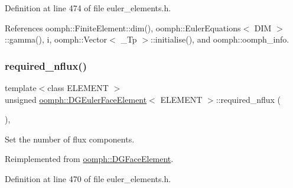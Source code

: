 Definition at line 474 of file euler\+\_\+elements.\+h.



References oomph\+::\+Finite\+Element\+::dim(), oomph\+::\+Euler\+Equations$<$ D\+I\+M $>$\+::gamma(), i, oomph\+::\+Vector$<$ \+\_\+\+Tp $>$\+::initialise(), and oomph\+::oomph\+\_\+info.

\mbox{\label{classoomph_1_1DGEulerFaceElement_aa20647527c6e5dc1febb13e575d971bb}} 
\subsubsection{\texorpdfstring{required\+\_\+nflux()}{required\_nflux()}}
{\footnotesize\ttfamily template$<$class E\+L\+E\+M\+E\+NT $>$ \\
unsigned \hyperlink{classoomph_1_1DGEulerFaceElement}{oomph\+::\+D\+G\+Euler\+Face\+Element}$<$ E\+L\+E\+M\+E\+NT $>$\+::required\+\_\+nflux (\begin{DoxyParamCaption}{ }\end{DoxyParamCaption})\hspace{0.3cm}{\ttfamily [inline]}, {\ttfamily [virtual]}}



Set the number of flux components. 



Reimplemented from \hyperlink{classoomph_1_1DGFaceElement_af45b5a88226a143c8fafbc5f3e097526}{oomph\+::\+D\+G\+Face\+Element}.



Definition at line 470 of file euler\+\_\+elements.\+h.

\mbox{\label{classoomph_1_1DGEulerFaceElement_af109fc02678e54552d8a63407731ddb1}} 
